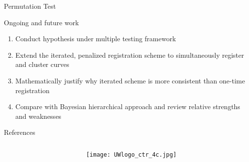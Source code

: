 \documentclass[final]{beamer}
\newlength{\onecolwid}
\begin{document}
\begin{frame}{}
\begin{columns}[t]
\begin{column}{\onecolwid}
\begin{block}{Permutation Test}
      \end{block}
      \begin{block}{Ongoing and future work}
        \begin{enumerate}
        \item Conduct hypothesis under multiple testing framework
        \item Extend the iterated, penalized registration scheme to simultaneously register and cluster curves
        \item Mathematically justify why iterated scheme is more consistent than one-time registration
        \item Compare with Bayesian hierarchical approach and review relative strengths and weaknesses
        \end{enumerate}
        
      \end{block}
      \begin{block}{References}
        {\footnotesize
           
          
        }
      \end{block}
      \begin{columns}
        \begin{column}{0.65\textwidth}\end{column}
        \begin{column}{0.35\textwidth}
          \begin{figure}[!b]
            \texttt{[image: UWlogo\_ctr\_4c.jpg]}
          \end{figure}
        \end{column}
      \end{columns}
    \end{column}
  \end{columns}
\end{frame}
\end{document}

